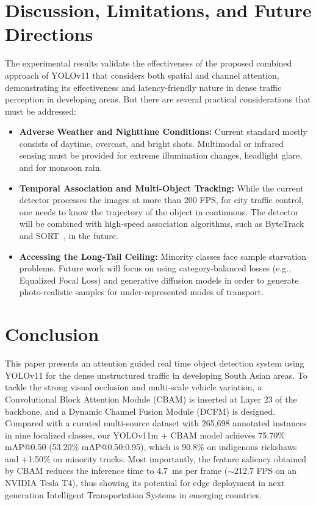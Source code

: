 \documentclass[pdflatex,sn-mathphys]{sn-jnl}
\begin{document}
\section{Discussion, Limitations, and Future Directions}\label{sec:discussion}

The experimental results validate the effectiveness of the proposed combined approach of YOLOv11 that considers both spatial and channel attention, demonstrating its effectiveness and latency-friendly nature in dense traffic perception in developing areas. But there are several practical considerations that must be addressed:
\begin{itemize}
    \item \textbf{Adverse Weather and Nighttime Conditions:} Current standard mostly consists of daytime, overcast, and bright shots. Multimodal or infrared sensing must be provided for extreme illumination changes, headlight glare, and for monsoon rain.
    \item \textbf{Temporal Association and Multi-Object Tracking:} While the current detector processes the images at more than 200 FPS, for city traffic control, one needs to know the trajectory of the object in continuous. The detector will be combined with high-speed association algorithms, such as ByteTrack~\cite{zhang2022bytetrack} and SORT~\cite{bewley2016simple}, in the future.
    \item \textbf{Accessing the Long-Tail Ceiling:} Minority classes face sample starvation problems. Future work will focus on using category-balanced losses (e.g., Equalized Focal Loss) and generative diffusion models in order to generate photo-realistic samples for under-represented modes of transport.
\end{itemize}

\section{Conclusion}\label{sec:conclusion}

This paper presents an attention guided real time object detection system using YOLOv11 for the dense unstructured traffic in developing South Asian areas. To tackle the strong visual occlusion and multi-scale vehicle variation, a Convolutional Block Attention Module (CBAM) is inserted at Layer 23 of the backbone, and a Dynamic Channel Fusion Module (DCFM) is designed. Compared with a curated multi-source dataset with 265,698 annotated instances in nine localized classes, our YOLOv11m + CBAM model achieves 75.70\% mAP@0.50 (53.20\% mAP@0.50:0.95), which is 90.8\% on indigenous rickshaws and +1.50\% on minority trucks. Most importantly, the feature saliency obtained by CBAM reduces the inference time to 4.7~ms per frame ($\sim$212.7 FPS on an NVIDIA Tesla T4), thus showing its potential for edge deployment in next generation Intelligent Transportation Systems in emerging countries.
\end{document}
